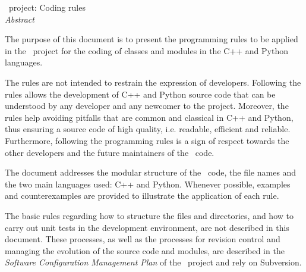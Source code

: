 \vspace{0.5in}
\begin{center}
   \large \centering
  \OT\ project: Coding rules \\
  \vspace{0.3in}
  \emph{ Abstract}
  \vspace{0.5in}
\end{center}

The purpose of this document is to present the programming rules to be applied in the \OT\ project for the coding of classes and modules in the C++ and Python languages.

The rules are not intended to restrain the expression of developers. Following the rules allows the development of C++ and Python source code that can be understood by any developer and any newcomer to the project. Moreover, the rules help avoiding pitfalls that are common and classical in C++ and Python, thus ensuring a source code of high quality, i.e. readable, efficient and reliable. Furthermore, following the programming rules is a sign of respect towards the other developers and the future maintainers of the \OT\ code.

The document addresses the modular structure of the \OT\ code, the file names and the two main languages used: C++ and Python. Whenever possible, examples and counterexamples are provided to illustrate the application of each rule.

The basic rules regarding how to structure the files and directories, and how to carry out unit tests in the development environment, are not described in this document. These processes, as well as the processes for revision control and managing the evolution of the source code and modules, are described in the \emph{Software Configuration Management Plan} of the \OT\ project and rely on Subversion.
